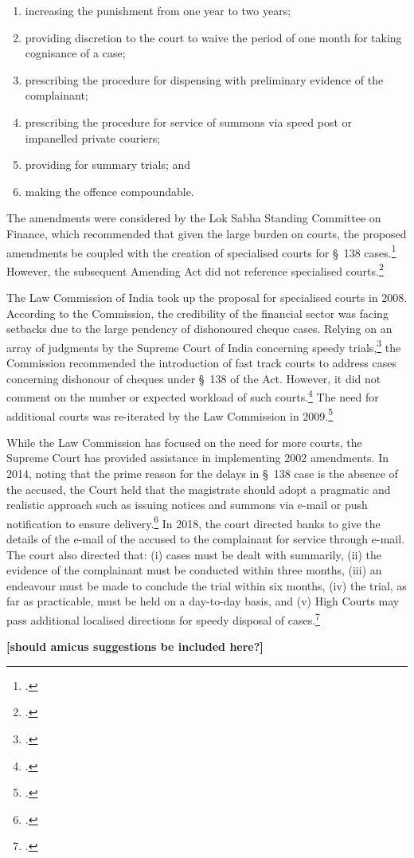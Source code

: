 \begin{enumerate}[label=(\alph*)]
 \item increasing the punishment from one year to two years;
 \item providing discretion to the court to waive the period of one month for taking cognisance of a case;
 \item prescribing the procedure for dispensing with preliminary evidence of the complainant;
 \item prescribing the procedure for service of summons via speed post or impanelled private couriers;
 \item providing for summary trials; and
 \item making the offence compoundable.
\end{enumerate}

The amendments were considered by the Lok Sabha Standing Committee on Finance, which recommended that given the large burden on courts, the proposed amendments be coupled with the creation of specialised courts for \S~138 cases.\footcite{stdcomm2001_138niAct} However, the subsequent Amending Act did not reference specialised courts.\footcite{niAmend2002}

The Law Commission of India took up the proposal for specialised courts in 2008. According to the Commission, the credibility of the financial sector was facing setbacks due to the large pendency of dishonoured cheque cases. Relying on an array of judgments by the Supreme Court of India concerning speedy trials,\footcite{sc1978_khatoon, sc1981_champalal, sc2005_surinder, sc2008_krishna} the Commission recommended the introduction of fast track courts to address cases concerning dishonour of cheques under \S~138 of the Act. However, it did not comment on the number or expected workload of such courts.\footcite{lci2008_138} The need for additional courts was re-iterated by the Law Commission in 2009.\footcite{lci2009_reforms}

While the Law Commission has focused on the need for more courts, the Supreme Court has provided assistance in implementing 2002 amendments. In 2014, noting that the prime reason for the delays in \S~138 case is the absence of the accused, the Court held that the magistrate should adopt a pragmatic and realistic approach such as issuing notices and summons via e-mail or push notification to ensure delivery.\footcite{sc2014_iba} In 2018, the court directed banks to give the details of the e-mail of the accused to the complainant for service through e-mail. The court also directed that: (i) cases must be dealt with summarily, (ii) the evidence of the complainant must be conducted within three months, (iii) an endeavour must be made to conclude the trial within six months, (iv) the trial, as far as practicable, must be held on a day-to-day basis, and (v) High Courts may pass additional localised directions for speedy disposal of cases.\footcite{sc2018_meters}

\textbf{[should amicus suggestions be included here?]}

